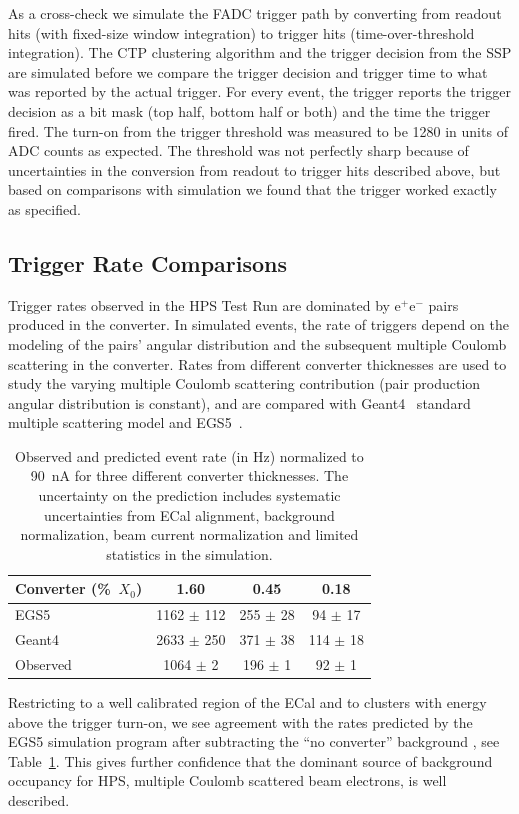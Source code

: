 \documentclass[final,3p,times,twocolumn]{elsarticle}
\newcommand{\ee}{e$^+$e$^-$}
\newcommand{\egs}{{\sc EGS5}}
\begin{document}
As a cross-check we simulate the FADC trigger path by converting from readout hits (with fixed-size 
window integration) to trigger hits (time-over-threshold integration). The CTP clustering 
algorithm and the trigger decision from the SSP are simulated before we compare the trigger decision 
and trigger time to what was reported by the actual trigger. For every event, the trigger reports the 
trigger decision as a bit mask (top half, bottom half or both) and the time the trigger fired.
The turn-on from the trigger threshold was measured to be 1280 in units of ADC counts as expected. 
The threshold was not perfectly sharp because of uncertainties in the conversion from readout to trigger 
hits described above, but based on comparisons with simulation we found that the 
trigger worked exactly as specified.


\subsection{Trigger Rate Comparisons}
Trigger rates observed in the HPS Test Run are dominated by \ee{} pairs produced in the 
converter. In simulated events, the rate of triggers depend on the modeling of the pairs' angular 
distribution and the subsequent multiple Coulomb scattering in the converter. Rates from different 
converter 
thicknesses are used to study the varying multiple Coulomb scattering contribution (pair production 
angular distribution is constant), and are compared with Geant4~\cite{Agostinelli2003250} standard multiple 
scattering model and EGS5~\cite{egs5}. 
\begin{table}
{\small
\begin{tabular}{|l|c|c|c|}
\hline
\bf Converter (\%~$X_0$) & \bf 1.60 & \bf 0.45 &	\bf 0.18 \\
\hline
EGS5 &	1162 $\pm$ 112 &	255 $\pm$ 28 &	94 $\pm$ 17	\\
\hline
Geant4 & 2633 $\pm$ 250 & 	371 $\pm$ 38 &	114 $\pm$ 18 \\
\hline
Observed 	& 1064 $\pm$ 2 & 196 $\pm$ 1 &	92 $\pm$ 1 \\						
\hline
\end{tabular}
\caption{ Observed and predicted event rate (in Hz) normalized to 90~nA for three different converter 
thicknesses. The uncertainty on the prediction includes systematic uncertainties from ECal alignment, background normalization, beam current normalization and limited statistics in the simulation.
\label{results}}
}
\end{table}
Restricting to a well calibrated region of the ECal and to clusters with energy above the trigger turn-on, 
we see agreement with the rates predicted by the \egs{} simulation program after subtracting the 
``no converter'' background , see Table~\ref{results}.
This gives further confidence that the dominant source of background occupancy for HPS, multiple 
Coulomb scattered beam electrons, is well 
described.
\end{document}
